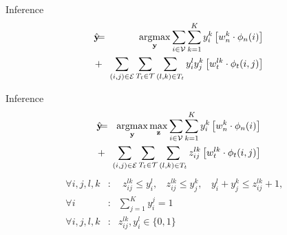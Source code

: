\documentclass{beamer}
\DeclareMathOperator*{\argmax}{argmax}
\newcommand{\y}{{\mathbf y}}     %
\newcommand{\ysc}[2]{{y_{#1}^{#2}}}    %
\newcommand{\zsc}[2]{{z_{#1}^{#2}}}    %
\newcommand{\fn}[1]{{\phi_n(#1)}}      %
\newcommand{\fe}[3]{{\phi_{#1}(#2,#3)}}%
\newcommand{\wn}[1]{{w_n^{#1}}}        %
\newcommand{\we}[3]{{w_{#1}^{#2#3}}}   %
\begin{document}
\begin{frame}{Inference}
 \begin{eqnarray*}
\hat{\y}\!\!\!&=&\!\!\!\argmax_{\y} \sum_{i \in \mathcal{V}} \sum_{k=1}^{K} \ysc{i}{k} \left[\wn{k} \cdot \fn{i} \right] \\
&+&  \!\!\!\sum_{(i,j)\in \mathcal{E}}  \sum_{T_t \in {\cal T}} \sum_{(l,k)\in T_t} \ysc{i}{l} \ysc{j}{k}  \left[\we{t}{l}{k} \cdot \fe{t}{i}{j}\right] 
 \label{eq:relaxobj}\\
\end{eqnarray*}
\end{frame}

\begin{frame}{Inference}
 \begin{eqnarray*}
\hat{\y}\!\!\!&=&\!\!\!\argmax_{\y}\max_{\mathbf z} \sum_{i \in \mathcal{V}} \sum_{k=1}^{K} \ysc{i}{k} \left[\wn{k} \cdot \fn{i} \right] \\
&+&  \!\!\!\sum_{(i,j)\in \mathcal{E}}  \sum_{T_t \in {\cal T}} \sum_{(l,k)\in T_t} \zsc{ij}{lk} \left[\we{t}{l}{k} \cdot \fe{t}{i}{j}\right] 
 \label{eq:relaxobj}\\
\end{eqnarray*}
 \begin{eqnarray*}
  \forall i,j,l,k &:& \:\: \zsc{ij}{lk}\le \ysc{i}{l}, \:\:\:\:
\zsc{ij}{lk}\le \ysc{j}{k},\:\:\:\:
\ysc{i}{l} + \ysc{j}{k} \le \zsc{ij}{lk}+1,\:\:\:\: \\
\forall i &:& \sum_{j=1}^{K} y_i^j = 1\\
\forall i,j,l,k &:& \zsc{ij}{lk},\ysc{i}{l} \in \{ 0,1 \} \label{eq:relaxconst}
\end{eqnarray*}
\end{frame}
\end{document}
